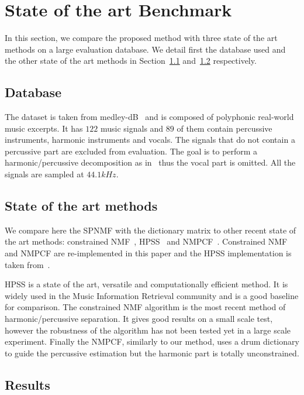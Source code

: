 
\section{State of the art Benchmark}
\label{sec:stateoftheart}

In this section, we compare the proposed method with three state of the art methods on a large evaluation database. We detail first the database used and the other state of the art methods in Section~\ref{database} and~\ref{soth} respectively.  


\subsection{Database}
\label{database}

The dataset is taken from medley-dB~\cite{bittner2014medleydb} and is composed of polyphonic real-world music excerpts. It has $122$ music signals and $89$ of them contain percussive instruments, harmonic instruments and vocals. The signals that do not contain a percussive part are excluded from evaluation. The goal is to perform a harmonic/percussive decomposition as in~\cite{canadas2014percussive} thus the vocal part is omitted. All the signals are sampled at $44.1kHz$.

\subsection{State of the art methods}
\label{soth}

We compare here the SPNMF with the dictionary matrix to other recent state of the art methods: constrained NMF~\cite{canadas2014percussive}, HPSS~\cite{fitzgerald2010harmonic} and NMPCF~\cite{kim2011nonnegative}. Constrained NMF and NMPCF are re-implemented in this paper and the HPSS implementation is taken from~\cite{DriedgerMueller14_TSMToolbox_DAFX}.

HPSS is a state of the art, versatile and computationally efficient method. It is widely used in the Music Information Retrieval community and is a good baseline for comparison. The constrained NMF algorithm is the most recent method of harmonic/percussive separation. It gives good results on a small scale test, however the robustness of the algorithm has not been tested yet in a large scale experiment. Finally the NMPCF, similarly to our method, uses a drum dictionary to guide the percussive estimation but the harmonic part is totally unconstrained. 


\subsection{Results} 
\label{subResults}

